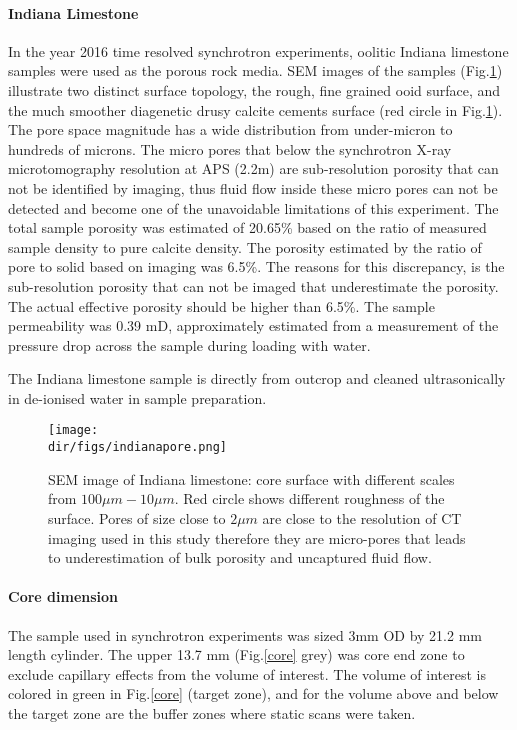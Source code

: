 \paragraph{Indiana Limestone}
In the year 2016 time resolved synchrotron experiments, oolitic Indiana limestone samples were used as the porous rock media. SEM images of the samples (Fig.\ref{sempore}) illustrate two distinct surface topology, the rough, fine grained ooid surface, and the much smoother diagenetic drusy calcite cements surface (red circle in Fig.\ref{sempore}). The pore space magnitude has a wide distribution from under-micron to hundreds of microns. The micro pores that below the synchrotron X-ray microtomography resolution at APS (2.2\textmu m) are sub-resolution porosity that can not be identified by imaging, thus fluid flow inside these micro pores can not be detected and become one of the unavoidable limitations of this experiment. The total sample porosity was estimated of 20.65\% based on the ratio of measured sample density to pure calcite density. The porosity estimated by the ratio of pore to solid based on imaging was 6.5\%. The reasons for this discrepancy, is the sub-resolution porosity that can not be imaged that underestimate the porosity. The actual effective porosity should be higher than 6.5\%. The sample permeability was 0.39 mD, approximately estimated from a measurement of the pressure drop across the sample during loading with water.

The Indiana limestone sample is directly from outcrop and cleaned ultrasonically in de-ionised water in sample preparation.

\begin{figure}[htbp]
  \centering
  \texttt{[image: \\dir/figs/indianapore.png]}
  \caption{SEM image of Indiana limestone: core surface with different scales from $100 \mu m - 10 \mu m$. Red circle shows different roughness of the surface. Pores of size close to $2 \mu m$ are close to the resolution of CT imaging used in this study therefore they are micro-pores that leads to underestimation of bulk porosity and uncaptured fluid flow.}
  \label{sempore}
\end{figure}
\paragraph{Core dimension}
The sample used in synchrotron experiments was sized 3mm OD by 21.2 mm length cylinder. The upper 13.7 mm (Fig.\ref{core} grey) was core end zone to exclude capillary effects from the volume of interest. The volume of interest is colored in green in Fig.\ref{core} (target zone), and for the volume above and below the target zone are the buffer zones where static scans were taken.

